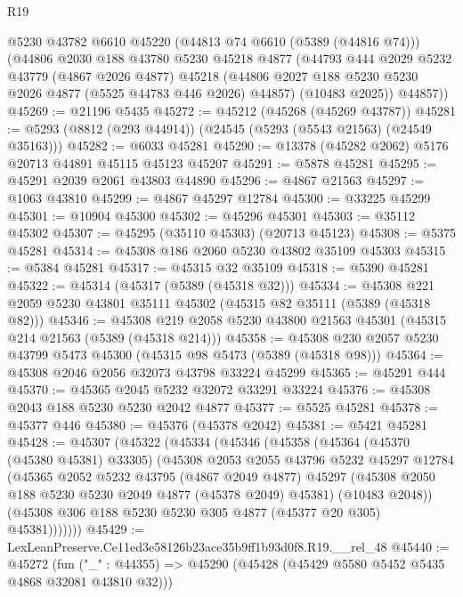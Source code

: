 \begin{lexlean}{R19}
\begin{coremodule}
      @5230
      @43782
      @6610
      @45220
      (@44813 @74 @6610 (@5389 (@44816 @74)))
      (@44806
        @2030
        @188
        @43780
        @5230
        @45218
        @4877
        (@44793
          @444
          @2029
          @5232
          @43779
          (@4867 @2026 @4877)
          @45218
          (@44806 @2027 @188 @5230 @5230 @2026 @4877 (@5525 @44783 @446 @2026) @44857)
          (@10483 @2025))
        @44857))
@45269 := @21196 @5435
@45272 := @45212 (@45268 (@45269 @43787))
@45281 := @5293 (@8812 (@293 @44914)) (@24545 (@5293 (@5543 @21563) (@24549 @35163)))
@45282 := @6033 @45281
@45290 := @13378 (@45282 @2062) @5176 @20713 @44891 @45115 @45123 @45207
@45291 := @5878 @45281
@45295 := @45291 @2039 @2061 @43803 @44890
@45296 := @4867 @21563
@45297 := @1063 @43810
@45299 := @4867 @45297 @12784
@45300 := @33225 @45299
@45301 := @10904 @45300
@45302 := @45296 @45301
@45303 := @35112 @45302
@45307 := @45295 (@35110 @45303) (@20713 @45123)
@45308 := @5375 @45281
@45314 := @45308 @186 @2060 @5230 @43802 @35109 @45303
@45315 := @5384 @45281
@45317 := @45315 @32 @35109
@45318 := @5390 @45281
@45322 := @45314 (@45317 (@5389 (@45318 @32)))
@45334 := @45308 @221 @2059 @5230 @43801 @35111 @45302 (@45315 @82 @35111 (@5389 (@45318 @82)))
@45346 := @45308 @219 @2058 @5230 @43800 @21563 @45301 (@45315 @214 @21563 (@5389 (@45318 @214)))
@45358 := @45308 @230 @2057 @5230 @43799 @5473 @45300 (@45315 @98 @5473 (@5389 (@45318 @98)))
@45364 := @45308 @2046 @2056 @32073 @43798 @33224 @45299
@45365 := @45291 @444
@45370 := @45365 @2045 @5232 @32072 @33291 @33224
@45376 := @45308 @2043 @188 @5230 @5230 @2042 @4877
@45377 := @5525 @45281
@45378 := @45377 @446
@45380 := @45376 (@45378 @2042)
@45381 := @5421 @45281
@45428 := @45307
    (@45322
      (@45334
        (@45346
          (@45358
            (@45364
              (@45370 (@45380 @45381) @33305)
              (@45308
                @2053
                @2055
                @43796
                @5232
                @45297
                @12784
                (@45365
                  @2052
                  @5232
                  @43795
                  (@4867 @2049 @4877)
                  @45297
                  (@45308 @2050 @188 @5230 @5230 @2049 @4877 (@45378 @2049) @45381)
                  (@10483 @2048))
                (@45308 @306 @188 @5230 @5230 @305 @4877 (@45377 @20 @305) @45381)))))))
@45429 := LexLeanPreserve.Ce11ed3e58126b23ace35b9ff1b93d0f8.R19.__rel_48
@45440 := @45272
    (fun ("_" : @44355) => @45290 (@45428 (@45429 @5580 @5452 @5435 @4868 @32081 @43810 @32)))

\end{coremodule}
\end{lexlean}
